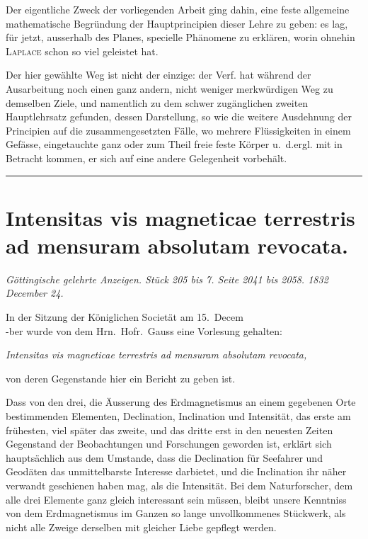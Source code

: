 \documentclass[12pt,a4paper]{article}
\begin{document}
\bigskip

Der eigentliche Zweck der vorliegenden Arbeit ging dahin, eine feste allgemeine mathematische Begründung der Hauptprincipien dieser Lehre zu geben: es lag, für jetzt, ausserhalb des Planes, specielle Phänomene zu erklären, worin ohnehin \textsc{Laplace} schon so viel geleistet hat.

Der hier gewählte Weg ist nicht der einzige: der Verf. hat während der Ausarbeitung noch einen ganz andern, nicht weniger merkwürdigen Weg zu demselben Ziele, und namentlich zu dem schwer zugänglichen zweiten Hauptlehrsatz gefunden, dessen Darstellung, so wie die weitere Ausdehnung der Principien auf die zusammengesetzten Fälle, wo mehrere Flüssigkeiten in einem Gefässe, eingetauchte ganz oder zum Theil freie feste Körper u.~d.ergl. mit in Betracht kommen, er sich auf eine andere Gelegenheit vorbehält.

\vspace{2em}
\begin{center}
    \rule{0.5\textwidth}{0.4pt}
\end{center}
\vspace{1em}


\section*{Intensitas vis magneticae terrestris ad mensuram absolutam revocata.}

\textit{Göttingische gelehrte Anzeigen. Stück 205 bis 7. Seite 2041 bis 2058. 1832 December 24.}

\bigskip

In der Sitzung der Königlichen Societät am 15.~Decem\\-ber wurde von dem Hrn.~Hofr.~Gauss eine Vorlesung gehalten:

\begin{center}
    \textit{Intensitas vis magneticae terrestris ad mensuram absolutam revocata,}
\end{center}

von deren Gegenstande hier ein Bericht zu geben ist.

Dass von den drei, die Äusserung des Erdmagnetismus an einem gegebenen Orte bestimmenden Elementen, Declination, Inclination und Intensität, das erste am frühesten, viel später das zweite, und das dritte erst in den neuesten Zeiten Gegenstand der Beobachtungen und Forschungen geworden ist, erklärt sich hauptsächlich aus dem Umstande, dass die Declination für Seefahrer und Geodäten das unmittelbarste Interesse darbietet, und die Inclination ihr näher verwandt geschienen haben mag, als die Intensität. Bei dem Naturforscher, dem alle drei Elemente ganz gleich interessant sein müssen, bleibt unsere Kenntniss von dem Erdmagnetismus im Ganzen so lange unvollkommenes Stückwerk, als nicht alle Zweige derselben mit gleicher Liebe gepflegt werden.
\end{document}
